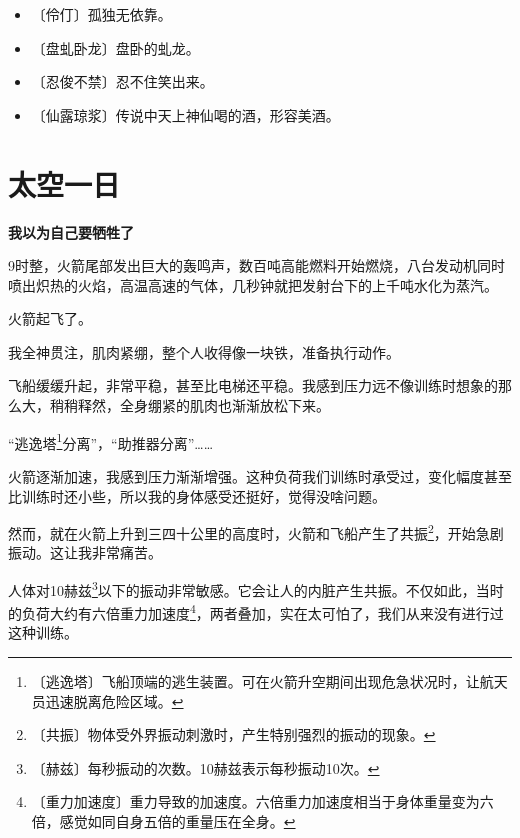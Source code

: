 \documentclass[12pt,UTF-8,openany]{ctexbook}
\begin{document}
\begin{itemize}
    \setlength\itemsep{-0.2em}
    \item 〔伶仃〕孤独无依靠。
    \item 〔盘虬卧龙〕盘卧的虬龙。
    \item 〔忍俊不禁〕忍不住笑出来。
    \item 〔仙露琼浆〕传说中天上神仙喝的酒，形容美酒。
\end{itemize}

\chapter{太空一日}

\begin{normalsize}
    
    \begin{center}
    
    \begin{large}\textbf{我以为自己要牺牲了}\end{large}
    
    \end{center}
    
    9时整，火箭尾部发出巨大的轰鸣声，数百吨高能燃料开始燃烧，八台发动机同时喷出炽热的火焰，高温高速的气体，几秒钟就把发射台下的上千吨水化为蒸汽。
    
    火箭起飞了。
    
    我全神贯注，肌肉紧绷，整个人收得像一块铁，准备执行动作。
    
    飞船缓缓升起，非常平稳，甚至比电梯还平稳。我感到压力远不像训练时想象的那么大，稍稍释然，全身绷紧的肌肉也渐渐放松下来。
    
    “逃逸塔\footnote{〔逃逸塔〕飞船顶端的逃生装置。可在火箭升空期间出现危急状况时，让航天员迅速脱离危险区域。}分离”，“助推器分离”……
    
    火箭逐渐加速，我感到压力渐渐增强。这种负荷我们训练时承受过，变化幅度甚至比训练时还小些，所以我的身体感受还挺好，觉得没啥问题。
    
    然而，就在火箭上升到三四十公里的高度时，火箭和飞船产生了共振\footnote{〔共振〕物体受外界振动刺激时，产生特别强烈的振动的现象。}，开始急剧振动。这让我非常痛苦。
    
    人体对10赫兹\footnote{〔赫兹〕每秒振动的次数。10赫兹表示每秒振动10次。}以下的振动非常敏感。它会让人的内脏产生共振。不仅如此，当时的负荷大约有六倍重力加速度\footnote{〔重力加速度〕重力导致的加速度。六倍重力加速度相当于身体重量变为六倍，感觉如同自身五倍的重量压在全身。}，两者叠加，实在太可怕了，我们从来没有进行过这种训练。
    

\end{normalsize}
\end{document}
